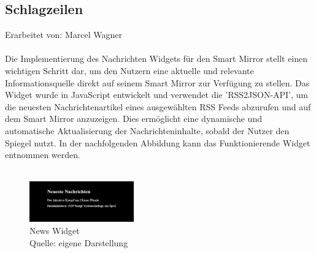 \subsection{Schlagzeilen}
Erarbeitet von: Marcel Wagner \\ \\
\noindent
Die Implementierung des Nachrichten Widgets für den Smart Mirror stellt einen wichtigen Schritt dar, um den Nutzern eine aktuelle und relevante Informationsquelle direkt auf seinem Smart Mirror zur Verfügung zu stellen. Das Widget wurde in JavaScript entwickelt und verwendet die 'RSS2JSON-API', um die neuesten Nachrichtenartikel eines ausgewählten RSS Feeds abzurufen und auf dem Smart Mirror anzuzeigen. Dies ermöglicht eine dynamische und automatische Aktualisierung der Nachrichteninhalte, sobald der Nutzer den Spiegel nutzt. In der nachfolgenden Abbildung kann das Funktionierende Widget entnommen werden.\\ \\
\clearpage
\noindent
\begin{figure}[h]
    \centering
    \includegraphics[width=0.4\textwidth]{pictures/news_widget.png}
  \captionsetup{justification=centering, labelformat=simple, singlelinecheck=false}
    \caption[News Widget]{News Widget\\ Quelle: eigene Darstellung}
\end{figure}

